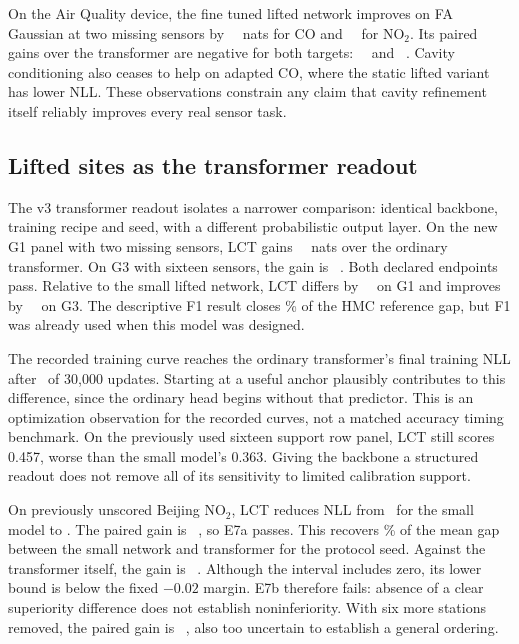On the Air Quality device, the fine tuned lifted network improves on FA Gaussian at two missing sensors by \RairqcoeTwovsfa\ \RairqcoeTwovsfaci\ nats for CO and \RairqnoTwoeTwovsfa\ \RairqnoTwoeTwovsfaci\ for NO$_2$. Its paired gains over the transformer are negative for both targets: \RairqcoeTwovspfn\ \RairqcoeTwovspfnci\ and \RairqnoTwoeTwovspfn\ \RairqnoTwoeTwovspfnci. Cavity conditioning also ceases to help on adapted CO, where the static lifted variant has lower NLL. These observations constrain any claim that cavity refinement itself reliably improves every real sensor task.

\subsection{Lifted sites as the transformer readout}
\label{sec:exp-v3}



The v3 transformer readout isolates a narrower comparison: identical backbone, training recipe and seed, with a different probabilistic output layer. On the new G1 panel with two missing sensors, LCT gains \VthreeGOnekTwolctvspfn\ \VthreeGOnekTwolctvspfnci\ nats over the ordinary transformer. On G3 with sixteen sensors, the gain is \VthreeGThreekTwolctvspfn\ \VthreeGThreekTwolctvspfnci. Both declared endpoints pass. Relative to the small lifted network, LCT differs by \VthreeGOnekTwolctvslift\ \VthreeGOnekTwolctvsliftci\ on G1 and improves by \VthreeGThreekTwolctvslift\ \VthreeGThreekTwolctvsliftci\ on G3. The descriptive F1 result closes \Gaplct\% of the HMC reference gap, but F1 was already used when this model was designed.

The recorded training curve reaches the ordinary transformer's final training NLL after \Trainlctreach\ of 30,000 updates. Starting at a useful anchor plausibly contributes to this difference, since the ordinary head begins without that predictor. This is an optimization observation for the recorded curves, not a matched accuracy timing benchmark. On the previously used sixteen support row panel, LCT still scores 0.457, worse than the small model's 0.363. Giving the backbone a structured readout does not remove all of its sensitivity to limited calibration support.

On previously unscored Beijing NO$_2$, LCT reduces NLL from \VthreebeijingnoTwoeZerovallift\ for the small model to \VthreebeijingnoTwoeZerovallct. The paired gain is \VthreebeijingnoTwoeZerolctvslift\ \VthreebeijingnoTwoeZerolctvsliftci, so E7a passes. This recovers \VthreebeijingnoTwoeZerorecovered\% of the mean gap between the small network and transformer for the protocol seed. Against the transformer itself, the gain is \VthreebeijingnoTwoeZerolctvspfn\ \VthreebeijingnoTwoeZerolctvspfnci. Although the interval includes zero, its lower bound is below the fixed $-0.02$ margin. E7b therefore fails: absence of a clear superiority difference does not establish noninferiority. With six more stations removed, the paired gain is \VthreebeijingnoTwoeSixlctvspfn\ \VthreebeijingnoTwoeSixlctvspfnci, also too uncertain to establish a general ordering.

